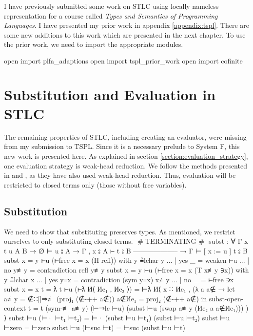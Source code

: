\documentclass[logo,bsc,singlespacing,parskip,online]{infthesis}
\renewenvironment{code}{\mintedcopy[breaklines,breaksymbolleft=\;]{agda}}{\endmintedcopy}
\begin{document}
I have previously submitted some work on STLC using locally nameless representation for a course
called \textit{Types and Semantics of Programming Languages}. I have presented my prior work in
appendix \ref{appendix:tspl}. There are some new additions to this work which are presented in the
next chapter. To use the prior work, we need to import the appropriate modules.

\begin{code}
open import plfa_adaptions
open import tspl_prior_work
open import cofinite
\end{code}

\chapter{Substitution and Evaluation in STLC}
The remaining properties of STLC, including creating an evaluator, were missing from my submission
to TSPL. Since it is a necessary prelude to System F, this new work is presented here. As explained
in section \ref{section:evaluation_strategy}, one evaluation strategy is weak-head reduction. We
follow the methods presented in \citet[chapter~Properties]{wadler_programming_2022} and
\citet[section~5]{chargueraud_locally_2012}, as they have also used weak-head reduction. Thus,
evaluation will be restricted to closed terms only (those without free variables).

\section{Substitution}
We need to show that substituting preserves types. As mentioned, we restrict ourselves to only
substituting closed terms.
\begin{code}
{-# TERMINATING #-}
subst : ∀ {Γ x t u A B}
  → ∅ ⊢ u ⦂ A
  → Γ , x ⦂ A ⊢ t ⦂ B
    --------------------
  → Γ ⊢ [ x := u ] t ⦂ B
subst {x = y} ⊢u (⊢free {x = x} (H refl)) with y ≟lchar y
... | yes _   = weaken ⊢u
... | no  y≢y = contradiction refl y≢y
subst {x = y} ⊢u (⊢free {x = x} (T x≢y ∋x)) with y ≟lchar x
... | yes y≡x = contradiction (sym y≡x) x≢y
... | no  _   = ⊢free ∋x
subst {x = x} {t = ƛ t} ⊢u (⊢ƛ И⟨ Иe₁ , Иe₂ ⟩) =
  ⊢ƛ И⟨ x ∷ Иe₁
      , (λ a {a∉} →
        let a≢y   = ∉∷[]⇒≢ (proj₁ (∉-++ a∉))
            a∉Иe₁ = proj₂ (∉-++ a∉)
        in subst-open-context
          {t = t}
          (sym-≢ a≢y)
          (⊢⇒lc ⊢u)
          (subst ⊢u (swap a≢y (Иe₂ a {a∉Иe₁}))) )
      ⟩
subst ⊢u (⊢· ⊢t₁ ⊢t₂) = ⊢· (subst ⊢u ⊢t₁) (subst ⊢u ⊢t₂)
subst ⊢u ⊢zero = ⊢zero
subst ⊢u (⊢suc ⊢t) = ⊢suc (subst ⊢u ⊢t)
\end{code}
\end{document}
